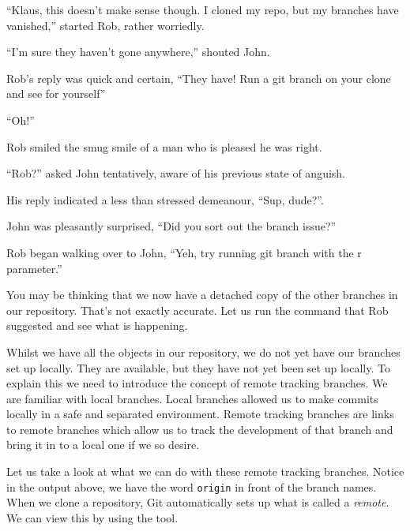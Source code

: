 \begin{trenches}
``Klaus, this doesn't make sense though. I cloned my repo, but my branches have vanished,'' started Rob, rather worriedly.

``I'm sure they haven't gone anywhere,'' shouted John.

Rob's reply was quick and certain, ``They have! Run a git branch on your clone and see for yourself''

``Oh!''

Rob smiled the smug smile of a man who is pleased he was right.

\thoughtbreak

``Rob?'' asked John tentatively, aware of his previous state of anguish.

His reply indicated a less than stressed demeanour, ``Sup, dude?''.

John was pleasantly surprised, ``Did you sort out the branch issue?''

Rob began walking over to John, ``Yeh, try running git branch with the r parameter.''

\end{trenches}

You may be thinking that we now have a detached copy of the other branches in our repository.
That's not exactly accurate.
Let us run the command that Rob suggested and see what is happening.


Whilst we have all the objects in our repository, we do not yet have our branches set up locally.
They are available, but they have not yet been set up locally.
To explain this we need to introduce the concept of remote tracking branches.
We are familiar with local branches.
Local branches allowed us to make commits locally in a safe and separated environment.
Remote tracking branches are links to remote branches which allow us to track the development of that branch and bring it in to a local one if we so desire.

Let us take a look at what we can do with these remote tracking branches.
Notice in the output above, we have the word \texttt{origin} in front of the branch names.
When we clone a repository, Git automatically sets up what is called a \emph{remote}.
We can view this by using the  tool.

